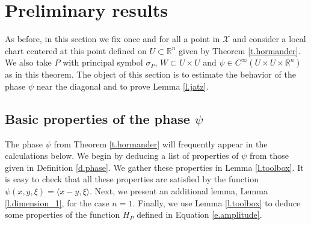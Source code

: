 \documentclass[10pt,twoside]{article}
\newcommand{\R}{\mathbb{R}}
\newcommand{\man}{\mathcal{X}}
\numberwithin{theorem}{section}
\begin{document}
\pagebreak



\section{Preliminary results}\label{s.preliminaries}

As before, in this section we fix once and for all a point in $\man$ and consider a local chart centered at this point defined on $U\subset\R^n$ given by Theorem \ref{t.hormander}. We also take $P$ with principal symbol $\sigma_P$, $W\subset U\times U$ and $\psi\in C^\infty(U\times U\times\R^n)$ as in this theorem. The object of this section is to estimate the behavior of the phase $\psi$ near the diagonal and to prove Lemma \ref{l.jatz}.

\subsection{Basic properties of the phase $\psi$}\label{ss.psi}

The phase $\psi$ from Theorem \ref{t.hormander} will frequently appear in the calculations below. We begin by deducing a list of properties of $\psi$ from those given in Definition \ref{d.phase}. We gather these properties in Lemma \ref{l.toolbox}. It is easy to check that all these properties are satisfied by the function $\psi(x,y,\xi)=\langle x-y,\xi\rangle$. Next, we present an additional lemma, Lemma \ref{l.dimension_1}, for the case $n=1$. Finally, we use Lemma \ref{l.toolbox} to deduce some properties of the function $H_P$ defined in Equation \eqref{e.amplitude}.
\end{document}
